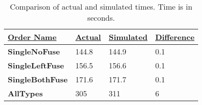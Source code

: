 \begin{table}[htb]
\centering
\begin{tabular}{|l|l|l|l|}
\hline
{\ul \textbf{Order Name}} & {\ul \textbf{Actual}} & {\ul \textbf{Simulated}} & {\ul \textbf{Difference}} \\ \hline
\textbf{SingleNoFuse}     & 144.8                 & 144.9                    & 0.1                       \\ \hline
\textbf{SingleLeftFuse}   & 156.5                 & 156.6                    & 0.1                       \\ \hline
\textbf{SingleBothFuse}   & 171.6                 & 171.7                    & 0.1                       \\ \hline
\textbf{AllTypes}         & 305                   & 311                      & 6                         \\ \hline
\end{tabular}
    \caption{Comparison of actual and simulated times. Time is in seconds.}
    \label{tab:cp-results}
\end{table}